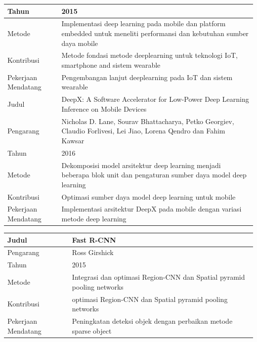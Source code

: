 \begin{table}
\begin{tabular}{ |m{2cm}|m{7cm}|m{1cm}|m{1cm}| }
		\hline
		Tahun & \multicolumn{3}{|m{13cm}|}{2015} \\ 
		\hline
		Metode & \multicolumn{3}{|m{13cm}|}{Implementasi deep learning pada mobile dan platform embedded untuk meneliti performansi dan kebutuhan sumber daya mobile}\\
		\hline
		Kontribusi  & \multicolumn{3}{|m{13cm}|}{Metode fondasi metode deeplearning untuk teknologi IoT, smartphone and sistem wearable}\\ 
		\hline
		Pekerjaan Mendatang  & \multicolumn{3}{|m{13cm}|}{Pengembangan lanjut deeplearning pada IoT dan sistem wearable} \\
		\hline\hline
		Judul & \multicolumn{3}{|m{13cm}|}{DeepX: A Software Accelerator for Low-Power Deep Learning Inference on Mobile Devices} \\
		\hline
		Pengarang & \multicolumn{3}{|m{13cm}|}{Nicholas D. Lane, Sourav Bhattacharya, Petko Georgiev, Claudio Forlivesi, Lei Jiao, Lorena Qendro dan Fahim Kawsar} \\ 
		\hline
		Tahun & \multicolumn{3}{|m{13cm}|}{2016} \\ 
		\hline
		Metode & \multicolumn{3}{|m{13cm}|}{Dekomposisi model arsitektur deep learning menjadi beberapa blok unit dan pengaturan sumber daya model deep learning}\\
		\hline
		Kontribusi  & \multicolumn{3}{|m{13cm}|}{Optimasi sumber daya model deep learning untuk mobile}\\ 
		\hline
		Pekerjaan Mendatang  & \multicolumn{3}{|m{13cm}|}{Implementasi arsitektur DeepX pada mobile dengan variasi metode deep learning} \\
		\hline
	\end{tabular}
\end{table}

\begin{table}
	\clearpage
	\centering
	\begin{tabular}{ |m{2cm}|m{7cm}|m{1cm}|m{1cm}| } 	
		\hline	
		Judul & \multicolumn{3}{|m{13cm}|}{Fast R-CNN} \\
		\hline
		Pengarang & \multicolumn{3}{|m{13cm}|}{Ross Girshick} \\ 
		\hline
		Tahun & \multicolumn{3}{|m{13cm}|}{2015} \\ 
		\hline
		Metode & \multicolumn{3}{|m{13cm}|}{Integrasi dan optimasi Region-CNN dan Spatial pyramid pooling networks}\\
		\hline
		Kontribusi  & \multicolumn{3}{|m{13cm}|}{optimasi Region-CNN dan Spatial pyramid pooling networks}\\ 
		\hline
		Pekerjaan Mendatang  & \multicolumn{3}{|m{13cm}|}{Peningkatan deteksi objek dengan perbaikan metode sparse object} \\
		\hline
	\end{tabular}
\end{table}
